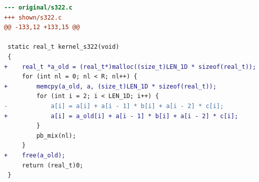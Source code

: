 \begin{lstlisting}[language=diff,basicstyle=\ttfamily\scriptsize,breaklines=true,caption={tsvc/s322 — no-change (e1_d) — shown: the program the agent built, then dropped (never shipped)}]
--- original/s322.c
+++ shown/s322.c
@@ -133,12 +133,15 @@
 
 static real_t kernel_s322(void)
 {
+    real_t *a_old = (real_t*)malloc((size_t)LEN_1D * sizeof(real_t));
     for (int nl = 0; nl < R; nl++) {
+        memcpy(a_old, a, (size_t)LEN_1D * sizeof(real_t));
         for (int i = 2; i < LEN_1D; i++) {
-            a[i] = a[i] + a[i - 1] * b[i] + a[i - 2] * c[i];
+            a[i] = a_old[i] + a[i - 1] * b[i] + a[i - 2] * c[i];
         }
         pb_mix(nl);
     }
+    free(a_old);
     return (real_t)0;
 }
 
\end{lstlisting}
